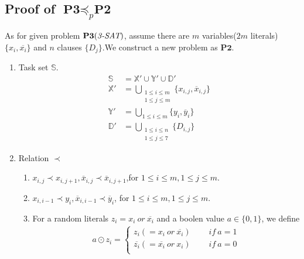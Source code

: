 \subsection{Proof of $\textbf{P3}\preceq_p \textbf{P2}$}
As for given problem $\textbf{P3}(\emph{3-SAT})$, assume there are $m$ variables($2m$ literals)$\{x_i,\overline{x_i}\}$ and $n$ clauses $\{D_j\}$.We construct a new problem as $\textbf{P2}$.
\begin{enumerate}
    \item Task set $\mathbb{S}$.
    \begin{equation}
    \begin{aligned}
        \mathbb{S}~&=\mathbb{X'\cup Y'\cup D'}\\
        \mathbb{X'}&=\bigcup_{\substack{1\le i\le m\\ 1\le j\le m}}\{x_{i,j},\overline{x}_{i,j}\}\\
        \mathbb{Y'}&=\bigcup_{1\le i\le m}\{y_i,\overline{y}_i\}\\
        \mathbb{D'}&=\bigcup_{\substack{1\le i\le n\\ 1\le j\le 7}}\{D_{i,j}\}
    \end{aligned}
    \end{equation}
    \item Relation $\prec$\\
    \begin{enumerate}
        \item $x_{i,j}\prec x_{i,j+1}, \overline{x}_{i,j}\prec \overline{x}_{i,j+1}$,for $1\le i\le m, 1\le j\le m$.
        \item $x_{i,i-1}\prec y_{i},\overline{x}_{i,i-1}\prec \overline{y}_{i}$, for $1\le i\le m, 1\le j\le m$.
        \item
        For a random literals $z_i=x_i~or~\overline{x_i}$ and a boolen value $a\in\{0,1\}$, we define 
        \begin{equation}
            \begin{aligned}
            a\odot z_i=\left\{\begin{array}{lr}
             z_i(=x_i~or~\overline{x_i})~~~~~~~~~~if~a=1\\
             \overline{z_i}(=\overline{x_i}~or~x_i)~~~~~~~~~~if~a=0\\
             \end{array}\right.
            \end{aligned}
        \end{equation}

\end{enumerate}
\end{enumerate}
